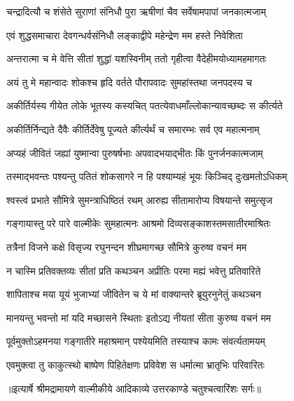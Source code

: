 \twolineshloka
{चन्द्रादित्यौ च शंसेते सुराणां संनिधौ पुरा}
{ऋषीणां चैव सर्वेषामपापां जनकात्मजाम्} %

\twolineshloka
{एवं शुद्धसमाचारा देवगन्धर्वसंनिधौ}
{लङ्काद्वीपे महेन्द्रेण मम हस्ते निवेशिता} %

\twolineshloka
{अन्तरात्मा च मे वेत्ति सीतां शुद्धां यशस्विनीम्}
{ततो गृहीत्वा वैदेहीमयोध्यामहमागतः} %

\twolineshloka
{अयं तु मे महान्वादः शोकश्च हृदि वर्तते}
{पौरापवादः सुमहांस्तथा जनपदस्य च} %

\twolineshloka
{अकीर्तिर्यस्य गीयेत लोके भूतस्य कस्यचित्}
{पतत्येवाधमाँल्लोकान्यावच्छब्दः स कीर्त्यते} %

\twolineshloka
{अकीर्तिर्निन्द्यते दैवैः कीर्तिर्देवेषु पूज्यते}
{कीर्त्यर्थं च समारम्भः सर्व एव महात्मनाम्} %

\twolineshloka
{अप्यहं जीवितं जह्यां युष्मान्वा पुरुषर्षभाः}
{अपवादभयाद्भीतः किं पुनर्जनकात्मजाम्} %

\twolineshloka
{तस्माद्भवन्तः पश्यन्तु पतितं शोकसागरे}
{न हि पश्याम्यहं भूयः किञ्चिद् दुःखमतोऽधिकम्} %

\twolineshloka
{श्वस्त्वं प्रभाते सौमित्रे सुमन्त्राधिष्ठितं रथम्}
{आरुह्य सीतामारोप्य विषयान्ते समुत्सृज} %

\twolineshloka
{गङ्गायास्तु परे पारे वाल्मीकेः सुमहात्मनः}
{आश्रमो दिव्यसङ्काशस्तमसातीरमाश्रितः} %

\twolineshloka
{तत्रैनां विजने कक्षे विसृज्य रघुनन्दन}
{शीघ्रमागच्छ सौमित्रे कुरुष्व वचनं मम} %

\twolineshloka
{न चास्मि प्रतिवक्तव्यः सीतां प्रति कथञ्चन}
{अप्रीतिः परमा मह्यं भवेत्तु प्रतिवारिते} %

\twolineshloka
{शापिताश्च मया यूयं भुजाभ्यां जीवितेन च}
{ये मां वाक्यान्तरे ब्रूयुरनुनेतुं कथञ्चन} %

\twolineshloka
{मानयन्तु भवन्तो मां यदि मच्छासने स्थिताः}
{इतोऽद्य नीयतां सीता कुरुष्व वचनं मम} %

\twolineshloka
{पूर्वमुक्तोऽहमनया गङ्गातीरे महाश्रमान्}
{पश्येयमिति तस्याश्च कामः संवर्त्यतामयम्} %

\twolineshloka
{एवमुक्त्वा तु काकुत्स्थो बाष्पेण पिहितेक्षणः}
{प्रविवेश स धर्मात्मा भ्रातृभिः परिवारितः} %


{॥इत्यार्षे श्रीमद्रामायणे वाल्मीकीये आदिकाव्ये उत्तरकाण्डे चतुश्चत्वारिंशः सर्गः॥}


